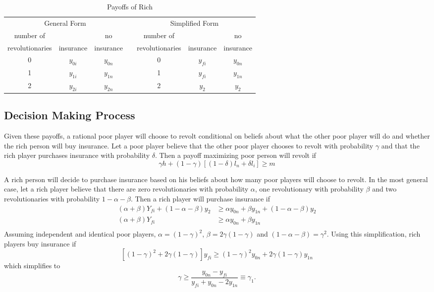 \documentclass[12pt]{article}
\begin{document}
	\begin{table}[!htbp]
		\caption{Payoffs of Rich}
		\label{rpayoffs}
		\centering
		\begin{tabular}{|c||c|c|c|c||c|c|}
			\multicolumn{3}{c}{General Form} &
			\multicolumn{1}{c}{} &
			\multicolumn{3}{c}{Simplified Form}\\
			\cline{1-3}\cline{5-7}
			number of & & no & & number of & & no\\
			revolutionaries & insurance & insurance && revolutionaries & insurance & insurance\\
			\cline{1-3}\cline{5-7}
			0 & $y_{0i}$ & $y_{0n}$ && 0 & $y_{fi}$ & $y_{0n}$\\
			\cline{1-3}\cline{5-7}
			1 & $y_{1i}$ & $y_{1n}$ && 1 & $y_{fi}$ & $y_{1n}$\\
			\cline{1-3}\cline{5-7}
			2 & $y_{2i}$ & $y_{2n}$ && 2 & $y_2$ & $y_2$\\
			\cline{1-3}\cline{5-7}
		\end{tabular}
	\end{table}
	
	\subsection{Decision Making Process}
	Given these payoffs, a rational poor player will choose to revolt 
	conditional on beliefs about what the other poor player will do and whether 
	the rich person will buy insurance. Let a poor player believe that the 
	other poor player chooses to revolt with probability $\gamma$ and that the 
	rich player purchases insurance with probability $\delta$. Then a payoff 
	maximizing poor person will revolt if
	$$\gamma h + (1-\gamma)\left[ (1-\delta)l_n + \delta l_i \right] \geq m $$
	
	A rich person will decide to purchase insurance based on his beliefs about 
	how many poor players will choose to revolt. In the most general case, let 
	a rich player believe that there are zero revolutionaries with probability 
	$\alpha$, one revolutionary with probability $\beta$ and two 
	revolutionaries with probability $1-\alpha-\beta$. Then a rich player will 
	purchase insurance if
	\begin{align*}
		(\alpha+\beta)Y_{fi} + (1-\alpha-\beta)y_2 &\geq \alpha y_{0n} + \beta 
		y_{1n} + (1-\alpha-\beta)y_2\\
		(\alpha+\beta)Y_{fi} &\geq \alpha y_{0n} + \beta y_{1n}\\
	\end{align*}
	Assuming independent and identical poor players, $\alpha=(1-\gamma)^2$, 
	$\beta=2\gamma(1-\gamma)$ and $(1-\alpha-\beta)=\gamma^2$. Using this 
	simplification, rich players buy insurance if
	$$ \left[(1-\gamma)^2 + 2\gamma(1-\gamma)\right]y_{fi} \geq 
	(1-\gamma)^2y_{0n} + 2\gamma(1-\gamma)y_{1n} $$
	which simplifies to
	\begin{equation}\tag{I}
		\label{I}
		\gamma \geq \frac{y_{0n} - y_{fi}}{y_{fi} + y_{0n} -2y_{1n}} \equiv 
		\gamma_1.
	\end{equation}
	
\end{document}
